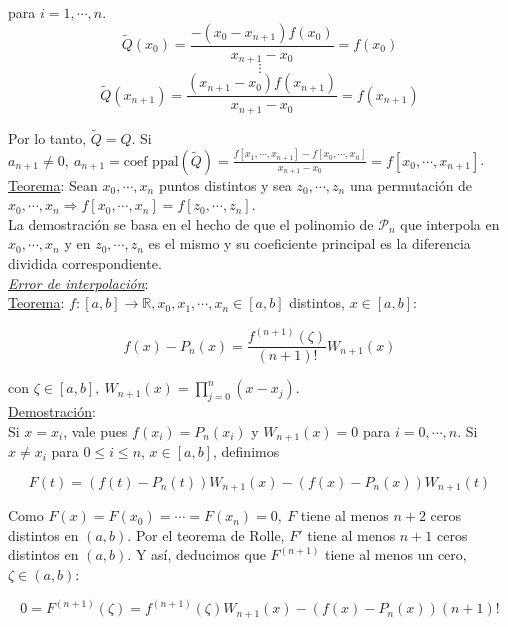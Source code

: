 para $i = 1, \cdots, n$.\\

$$\tilde{Q}({x_{0}}) = \frac{-(x_{0} - x_{n + 1})f(x_{0})}{x_{n + 1} - x_{0}} = f(x_{0})$$
$$\vdots$$
$$\tilde{Q}({x_{n + 1}}) = \frac{(x_{n + 1} - x_{0})f(x_{n + 1})}{x_{n + 1} - x_{0}} = f(x_{n + 1})$$

Por lo tanto, $\tilde{Q} = Q$. Si $a_{n + 1} \neq 0,\ a_{n + 1} = \text{coef ppal}(\tilde{Q}) = \frac{f[x_{1}, \cdots, x_{n + 1}] - f[x_{0}, \cdots, x_{n}]}{x_{n + 1} - x_{0}} = f[x_{0}, \cdots, x_{n + 1}]$.\\

\underline{Teorema}: Sean $x_{0}, \cdots, x_{n}$ puntos distintos y sea $z_{0}, \cdots, z_{n}$ una permutaci\'on de $x_{0}, \cdots, x_{n}\Rightarrow f[x_{0}, \cdots, x_{n}] = f[z_{0}, \cdots, z_{n}]$.\\

La demostraci\'on se basa en el hecho de que el polinomio de $\mathcal{P}_{n}$ que interpola en $x_{0}, \cdots, x_{n}$ y en $z_{0}, \cdots, z_{n}$ es el mismo y su coeficiente principal es la diferencia dividida correspondiente.\\

\underline{\textit{Error de interpolaci\'on}}:\\

\underline{Teorema}: $f: [a, b] \rightarrow \mathbb{R}, x_{0}, x_{1}, \cdots, x_{n} \in [a, b]$ distintos, $x \in [a, b]$:

$$f(x) - P_{n}(x) = \frac{f^{(n + 1)}(\zeta)}{(n + 1)!}W_{n + 1}(x)$$

con $\zeta \in [a, b],\ W_{n + 1}(x) = \prod\limits_{j = 0}^{n}(x - x_{j})$.\\

\underline{Demostraci\'on}:\\

Si $x = x_{i}$, vale pues $f(x_{i}) = P_{n}(x_{i})$ y $W_{n + 1}(x) = 0$ para $i = 0, \cdots, n$. Si $x \neq x_{i}$ para  $0 \leq i \leq n$, $x \in [a, b]$, definimos

$$F(t) = (f(t) - P_{n}(t))W_{n + 1}(x) - (f(x) - P_{n}(x))W_{n + 1}(t)$$

Como $F(x) = F(x_{0}) = \cdots = F(x_{n}) = 0,\ F$ tiene al menos $n + 2$ ceros distintos en $(a, b)$. Por el teorema de Rolle, $F'$ tiene al menos $n + 1$ ceros distintos en $(a, b)$. Y as\'i, deducimos que $F^{(n + 1)}$ tiene al menos un cero, $\zeta \in (a, b)$:

$$0 = F^{(n + 1)}(\zeta) = f^{(n + 1)}(\zeta)W_{n + 1}(x) - (f(x) - P_{n}(x))(n + 1)!$$

